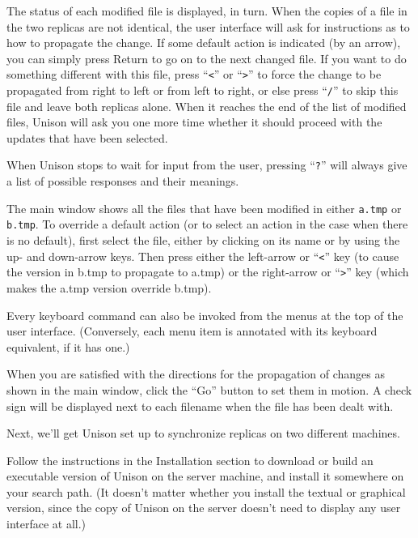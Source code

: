 \documentclass{article}
\begin{document}
\begin{textui}
The status of each modified file is displayed, in turn.  
When the copies of a file in the two replicas are not identical, the
user interface will ask for instructions as to how to propagate the
change.  If some default action is indicated (by an arrow), you can
simply press Return to go on to the next changed file.  If you want to
do something different with this file, press ``\verb|<|'' or ``\verb|>|'' to force
the change to be propagated from right to left or from left to right,
or else press ``\verb|/|'' to skip this file and leave both replicas alone.
When it reaches the end of the list of modified files, Unison will ask
you one more time whether it should proceed with the updates that have
been selected.

When Unison stops to wait for input from the user, pressing ``\verb|?|''
will always give a list of possible responses and their meanings.
\end{textui}

\begin{tkui}  
The main window shows all the files that have been modified in either
{\tt a.tmp} or {\tt b.tmp}.  To override a default action (or to select
an action in the case when there is no default), first select the file, either
by clicking on its name or by using the up- and down-arrow keys.  Then
press either the left-arrow or ``\verb|<|'' key (to cause the version in b.tmp to
propagate to a.tmp) or the right-arrow or ``\verb|>|'' key (which makes the a.tmp
version override b.tmp). 

Every keyboard command can also be invoked from the menus at the top
of the user interface.  (Conversely, each menu item is annotated with
its keyboard equivalent, if it has one.)

When you are satisfied with the directions for the propagation of changes
as shown in the main window, click the ``Go'' button to set them in
motion.  A check sign will be displayed next to each filename
when the file has been dealt with.
\end{tkui}



Next, we'll get Unison set up to synchronize replicas on two different
machines.

Follow the instructions in the Installation section to download or
build an executable version of Unison on the server machine, and
install it somewhere on your search path.  (It doesn't matter whether
you install the textual or graphical version, since the copy of Unison on
the server doesn't need to display any user interface at all.)  
\end{document}
